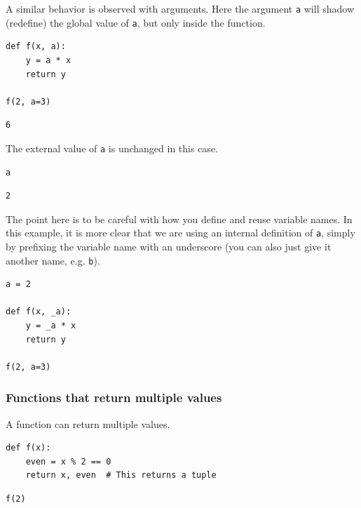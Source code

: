 \documentclass[11pt]{article}
\begin{document}
A similar behavior is observed with arguments. Here the argument \texttt{a} will shadow (redefine) the global value of \texttt{a}, but only inside the function.

\begin{verbatim}
def f(x, a):
    y = a * x
    return y

f(2, a=3)
\end{verbatim}

\begin{verbatim}
6
\end{verbatim}

The external value of \texttt{a} is unchanged in this case.

\begin{verbatim}
a
\end{verbatim}

\begin{verbatim}
2
\end{verbatim}

The point here is to be careful with how you define and reuse variable names. In this example, it is more clear that we are using an internal definition of \texttt{a}, simply by prefixing the variable name with an underscore (you can also just give it another name, e.g. \texttt{b}).

\begin{verbatim}
a = 2

def f(x, _a):
    y = _a * x
    return y

f(2, a=3)
\end{verbatim}

\subsubsection{Functions that return multiple values}
\label{sec:orgb4b9409}

A function can return multiple values.

\begin{verbatim}
def f(x):
    even = x % 2 == 0
    return x, even  # This returns a tuple
\end{verbatim}

\begin{verbatim}
f(2)
\end{verbatim}
\end{document}
